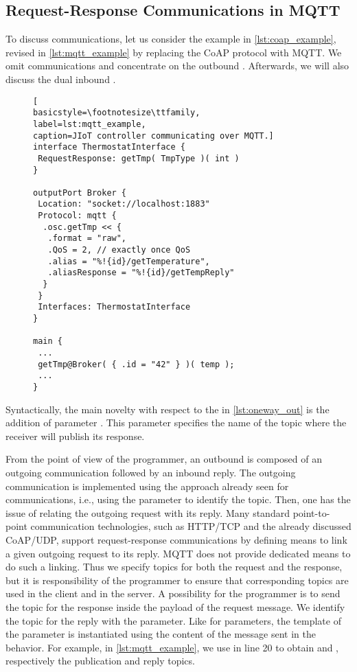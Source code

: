 \subsection{Request-Response Communications in MQTT}
\label{sub:rr_in_mqtt}

To discuss  communications, let us consider the
example in \cref{lst:coap_example}, revised in \cref{lst:mqtt_example}
by replacing the CoAP protocol with MQTT. We omit 
communications and concentrate on the
outbound . Afterwards, we will also discuss the
dual inbound .

\begin{figure}[t]
\begin{lstlisting}[
basicstyle=\footnotesize\ttfamily,
label=lst:mqtt_example,
caption=JIoT controller communicating over MQTT.]
interface ThermostatInterface {
 RequestResponse: getTmp( TmpType )( int )
}

outputPort Broker {
 Location: "socket://localhost:1883"
 Protocol: mqtt {
  .osc.getTmp << {
   .format = "raw",
   .QoS = 2, // exactly once QoS
   .alias = "%!{id}/getTemperature",
   .aliasResponse = "%!{id}/getTempReply"
  }
 }
 Interfaces: ThermostatInterface
}

main {
 ...
 getTmp@Broker( { .id = "42" } )( temp );
 ...
}
\end{lstlisting}
\end{figure}

Syntactically, the main novelty with respect to the  in
\cref{lst:oneway_out} is the addition of  parameter
. This parameter specifies the name of the topic
where the receiver will publish its response.

From the point of view of the programmer, an outbound  is
composed of an outgoing communication followed by an inbound reply. The outgoing
communication is implemented using the approach already seen for 
communications, i.e., using the   parameter to
identify the topic. Then, one has the issue of relating the outgoing request
with its reply. Many standard point-to-point communication technologies, such as
HTTP/TCP and the already discussed CoAP/UDP, support request-response
communications by defining means to link a given outgoing request to its reply.
MQTT does not provide dedicated means to do such a linking.
Thus we specify topics for both the request and the response, but it is responsibility of the programmer to ensure that corresponding topics are used in the client and in the server. A possibility for the programmer is to send the topic for the response inside the payload of the request message. 
%
We identify the topic for the reply with the
  parameter. Like for 
parameters, the template of the  parameter is instantiated
using the content of the message sent in the behavior. For example, in
\cref{lst:mqtt_example}, we use  in line 20 to obtain
 and , respectively the
publication and reply topics.

